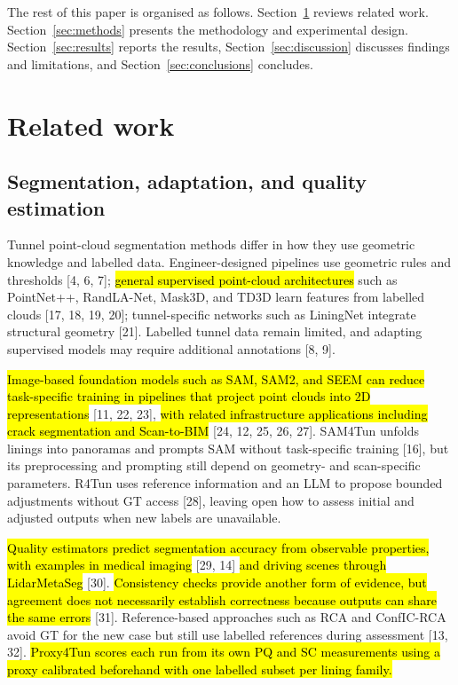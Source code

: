 \documentclass[a4paper,fleqn]{cas-dc}
\begin{document}
The rest of this paper is organised as follows. Section~\ref{sec:related} reviews related work. Section~\ref{sec:methods} presents the methodology and experimental design. Section~\ref{sec:results} reports the results, Section~\ref{sec:discussion} discusses findings and limitations, and Section~\ref{sec:conclusions} concludes.

\section{Related work}
\label{sec:related}

\subsection{Segmentation, adaptation, and quality estimation}

Tunnel point-cloud segmentation methods differ in how they use geometric knowledge and labelled data. Engineer-designed pipelines use geometric rules and thresholds [4, 6, 7]; \hl{general supervised point-cloud architectures} such as PointNet++, RandLA-Net, Mask3D, and TD3D learn features from labelled clouds [17, 18, 19, 20]; tunnel-specific networks such as LiningNet integrate structural geometry [21]. Labelled tunnel data remain limited, and adapting supervised models may require additional annotations [8, 9].

\hl{Image-based foundation models such as SAM, SAM2, and SEEM can reduce task-specific training in pipelines that project point clouds into 2D representations} [11, 22, 23], \hl{with related infrastructure applications including crack segmentation and Scan-to-BIM} [24, 12, 25, 26, 27]. SAM4Tun unfolds linings into panoramas and prompts SAM without task-specific training [16], but its preprocessing and prompting still depend on geometry- and scan-specific parameters. R4Tun uses reference information and an LLM to propose bounded adjustments without GT access [28], leaving open how to assess initial and adjusted outputs when new labels are unavailable.

\hl{Quality estimators predict segmentation accuracy from observable properties, with examples in medical imaging} [29, 14] \hl{and driving scenes through LidarMetaSeg} [30]. \hl{Consistency checks provide another form of evidence, but agreement does not necessarily establish correctness because outputs can share the same errors} [31]. Reference-based approaches such as RCA and ConfIC-RCA avoid GT for the new case but still use labelled references during assessment [13, 32]. \hl{Proxy4Tun scores each run from its own PQ and SC measurements using a proxy calibrated beforehand with one labelled subset per lining family.}
\end{document}
